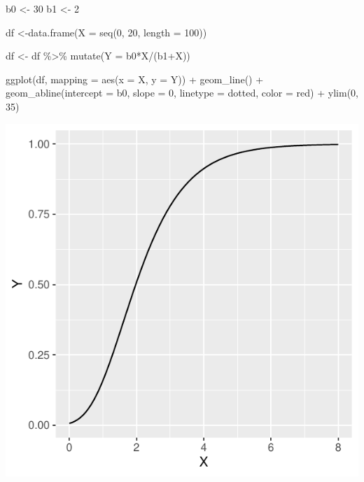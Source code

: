\documentclass[
]{book}
\newenvironment{Shaded}{\begin{snugshade}}{\end{snugshade}}
\newcommand{\AttributeTok}[1]{\textcolor[rgb]{0.77,0.63,0.00}{#1}}
\newcommand{\DecValTok}[1]{\textcolor[rgb]{0.00,0.00,0.81}{#1}}
\newcommand{\FunctionTok}[1]{\textcolor[rgb]{0.00,0.00,0.00}{#1}}
\newcommand{\NormalTok}[1]{#1}
\newcommand{\OtherTok}[1]{\textcolor[rgb]{0.56,0.35,0.01}{#1}}
\newcommand{\SpecialCharTok}[1]{\textcolor[rgb]{0.00,0.00,0.00}{#1}}
\newcommand{\StringTok}[1]{\textcolor[rgb]{0.31,0.60,0.02}{#1}}
\begin{document}
\begin{Shaded}
\begin{Highlighting}[]
\NormalTok{b0 }\OtherTok{\textless{}{-}} \DecValTok{30}
\NormalTok{b1 }\OtherTok{\textless{}{-}} \DecValTok{2}

\NormalTok{df }\OtherTok{\textless{}{-}}\FunctionTok{data.frame}\NormalTok{(}\AttributeTok{X =} \FunctionTok{seq}\NormalTok{(}\DecValTok{0}\NormalTok{, }\DecValTok{20}\NormalTok{, }\AttributeTok{length =} \DecValTok{100}\NormalTok{))}

\NormalTok{df }\OtherTok{\textless{}{-}}\NormalTok{ df }\SpecialCharTok{\%\textgreater{}\%} \FunctionTok{mutate}\NormalTok{(}\AttributeTok{Y =}\NormalTok{ b0}\SpecialCharTok{*}\NormalTok{X}\SpecialCharTok{/}\NormalTok{(b1}\SpecialCharTok{+}\NormalTok{X))}

\FunctionTok{ggplot}\NormalTok{(df, }\AttributeTok{mapping =} \FunctionTok{aes}\NormalTok{(}\AttributeTok{x =}\NormalTok{ X, }\AttributeTok{y =}\NormalTok{ Y)) }\SpecialCharTok{+}
  \FunctionTok{geom\_line}\NormalTok{() }\SpecialCharTok{+}
  \FunctionTok{geom\_abline}\NormalTok{(}\AttributeTok{intercept =}\NormalTok{ b0, }\AttributeTok{slope =} \DecValTok{0}\NormalTok{, }\AttributeTok{linetype =} \StringTok{\textquotesingle{}dotted\textquotesingle{}}\NormalTok{, }\AttributeTok{color =} \StringTok{\textquotesingle{}red\textquotesingle{}}\NormalTok{) }\SpecialCharTok{+}
  \FunctionTok{ylim}\NormalTok{(}\DecValTok{0}\NormalTok{, }\DecValTok{35}\NormalTok{)}
\end{Highlighting}
\end{Shaded}

\begin{center}\includegraphics{probest-cambientais_files/figure-latex/unnamed-chunk-225-1} \end{center}
\end{document}
